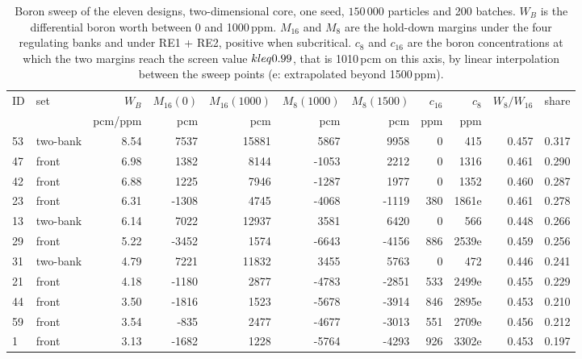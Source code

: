 \begin{table}[htbp]
  \centering
  \footnotesize
  \caption{Boron sweep of the eleven designs, two-dimensional core, one seed, $150\,000$ particles and 200 batches. $W_B$ is the differential boron worth between 0 and 1000\,ppm. $M_{16}$ and $M_8$ are the hold-down margins under the four regulating banks and under RE1 + RE2, positive when subcritical. $c_8$ and $c_{16}$ are the boron concentrations at which the two margins reach the screen value $k \\leq 0.99$, that is 1010\,pcm on this axis, by linear interpolation between the sweep points (e: extrapolated beyond 1500\,ppm).}
  \label{tab:c8-post-boron}
  \setlength{\tabcolsep}{2.5pt}\scriptsize
  \begin{tabular}{@{}l l r r r r r r r r r@{}}
    \toprule
    ID & set & $W_B$ & $M_{16}(0)$ & $M_{16}(1000)$ & $M_8(1000)$ & $M_8(1500)$ & $c_{16}$ & $c_8$ & $W_8/W_{16}$ & share \\
       &     & pcm/ppm & pcm & pcm & pcm & pcm & ppm & ppm &  &  \\
    \midrule
    53 & two-bank & 8.54 & 7537 & 15881 & 5867 & 9958 & 0 & 415 & 0.457 & 0.317 \\
    47 & front & 6.98 & 1382 & 8144 & -1053 & 2212 & 0 & 1316 & 0.461 & 0.290 \\
    42 & front & 6.88 & 1225 & 7946 & -1287 & 1977 & 0 & 1352 & 0.460 & 0.287 \\
    23 & front & 6.31 & -1308 & 4745 & -4068 & -1119 & 380 & 1861e & 0.461 & 0.278 \\
    13 & two-bank & 6.14 & 7022 & 12937 & 3581 & 6420 & 0 & 566 & 0.448 & 0.266 \\
    29 & front & 5.22 & -3452 & 1574 & -6643 & -4156 & 886 & 2539e & 0.459 & 0.256 \\
    31 & two-bank & 4.79 & 7221 & 11832 & 3455 & 5763 & 0 & 472 & 0.446 & 0.241 \\
    21 & front & 4.18 & -1180 & 2877 & -4783 & -2851 & 533 & 2499e & 0.455 & 0.229 \\
    44 & front & 3.50 & -1816 & 1523 & -5678 & -3914 & 846 & 2895e & 0.453 & 0.210 \\
    59 & front & 3.54 & -835 & 2477 & -4677 & -3013 & 551 & 2709e & 0.456 & 0.212 \\
    1 & front & 3.13 & -1682 & 1228 & -5764 & -4293 & 926 & 3302e & 0.453 & 0.197 \\
    \bottomrule
  \end{tabular}
\end{table}

